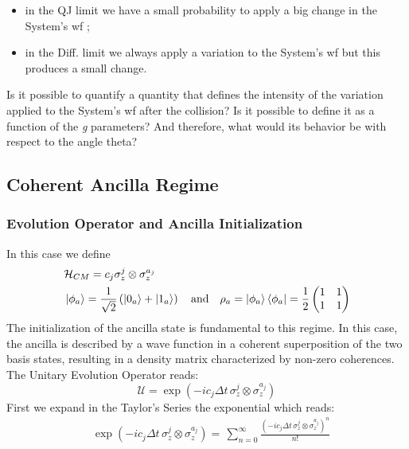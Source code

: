 \documentclass[a4paper,12pt]{article}
\begin{document}
	   \begin{itemize}
	   	\item in the QJ limit we have a small probability to apply a big change in the System's wf ;
	   	\item in the Diff. limit we always apply a variation to the System's wf but this produces a small change.
	   \end{itemize}
	   
	   Is it possible to quantify a quantity that defines the intensity of the variation applied to the System's wf after the collision? Is it possible to define it as a function of the \textit{g} parameters? And therefore, what would its behavior be with respect to the angle theta?
	
	
	
	  \clearpage
	  \newpage
	  
	  \subsection{Coherent Ancilla Regime}
	  
	  \subsubsection{Evolution Operator and Ancilla Initialization}
	  
	  In this case we define 
	  \begin{align} 
	  	&\mathcal{H}_{CM} = c_{j} \sigma_{z}^{j} \otimes \sigma_{z}^{a_j} \\
	  	&\ket{\phi_{a}} = \frac{1}{\sqrt{2}} \left(\ket{0_a} + \ket{1_a}\right) \quad \text{and} \quad \rho_{a} = \ket{\phi_a}\bra{\phi_a} = \frac{1}{2} \begin{pmatrix} 1 & 1 \\ 1 & 1 \end{pmatrix} 
	  \end{align}
	  The initialization of the ancilla state is fundamental to this regime. In this case, the ancilla is described by a wave function in a coherent superposition of the two basis states, resulting in a density matrix characterized by non-zero coherences. \\
	  The Unitary Evolution Operator reads: 
	  \begin{equation}
	  	\mathcal{U} = \exp{\left( -i c_j \Delta t \, \sigma_{z}^{j} \otimes \sigma_{z}^{a_j} \right)}
	  \end{equation}
	  First we expand in the Taylor's Series the exponential which reads:
	  \begin{equation}
	  	\begin{aligned}
	  		&\exp{\left( -i c_j \Delta t \, \sigma_{z}^{j} \otimes \sigma_{z}^{a_j} \right)} = \, \sum_{n=0}^{\infty}{\frac{\left( -i c_j \Delta t \, \sigma_{z}^{j} \otimes \sigma_{z}^{a_j} \right)^n}{n!} } \\
	  	\end{aligned}
	  \end{equation}
	  
\end{document}
